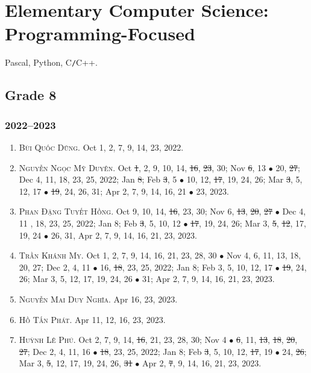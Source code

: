 \documentclass{article}
\begin{document}

\section{Elementary Computer Science: Programming-Focused}
Pascal, Python, C\texttt{/}C++.

\subsection{Grade 8}

\subsubsection{2022--2023}

\begin{enumerate}
	\item \textsc{Bùi Quốc Dũng.} {\sf[In]} Oct 1, 2, 7, 9, 14, 23, 2022. {\sf[Out]}
	\item \textsc{Nguyễn Ngọc Mỹ Duyên.} {\sf[In]} Oct \st{1}, 2, 9, 10, 14, \st{16}, \st{23}, 30; Nov \st{6}, 13 $\bullet$ 20, \st{27}; Dec 4, 11, 18, 23, 25, 2022; Jan \st{8}; Feb \st{3}, 5 $\bullet$ 10, 12, \st{17}, 19, 24, 26; Mar \st{3}, 5, 12, 17 $\bullet$ \st{19}, 24, 26, 31; Apr 2, 7, 9, 14, 16, 21 $\bullet$ 23, 2023.
	\item \textsc{Phan Đặng Tuyết Hồng.} {\sf[In]} Oct 9, 10, 14, \st{16}, 23, 30; Nov 6, \st{13}, \st{20}, \st{27} $\bullet$ Dec 4, 11 , 18, 23, 25, 2022; Jan 8; Feb \st{3}, 5, 10, 12 $\bullet$ \st{17}, 19, 24, 26; Mar 3, \st{5}, \st{12}, 17, 19, 24 $\bullet$ 26, 31, Apr 2, 7, 9, 14, 16, 21, 23, 2023.
	\item \textsc{Trần Khánh My.} {\sf[In]} Oct 1, 2, 7, 9, 14, 16, 21, 23, 28, 30 $\bullet$ Nov 4, 6, 11, 13, 18, 20, 27; Dec 2, 4, 11 $\bullet$ 16, \st{18}, 23, 25, 2022; Jan 8; Feb 3, 5, 10, 12, 17 $\bullet$ \st{19}, 24, 26; Mar 3, 5, 12, 17, 19, 24, 26 $\bullet$ 31; Apr 2, 7, 9, 14, 16, 21, 23, 2023.
	\item \textsc{Nguyễn Mai Duy Nghĩa.} {\sf[In]} Apr 16, 23, 2023.
	\item \textsc{Hồ Tấn Phát.} {\sf[In]} Apr 11, 12, 16, 23, 2023.
	\item \textsc{Huỳnh Lê Phú.} {\sf[In]} Oct 2, 7, 9, 14, \st{16}, 21, 23, 28, 30; Nov 4 $\bullet$ \st{6}, 11, \st{13}, \st{18}, \st{20}, \st{27}; Dec 2, 4, 11, 16 $\bullet$ \st{18}, 23, 25, 2022; Jan 8; Feb \st{3}, 5, 10, 12, \st{17}, 19 $\bullet$ 24, \st{26}; Mar 3, \st{5}, 12, 17, 19, 24, 26, \st{31} $\bullet$ Apr 2, \st{7}, 9, 14, 16, 21, 23, 2023.

\end{enumerate}
\end{document}
